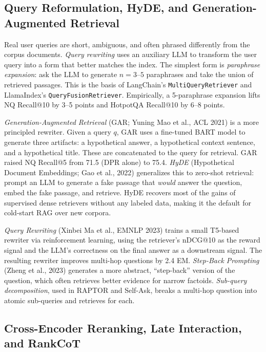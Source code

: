 \documentclass{article}
\begin{document}
\subsection{Query Reformulation, HyDE, and Generation-Augmented Retrieval}\label{query-reformulation-hyde-and-generation-augmented-retrieval}

Real user queries are short, ambiguous, and often phrased differently from the corpus documents. \emph{Query rewriting} uses an auxiliary LLM to transform the user query into a form that better matches the index. The simplest form is \emph{paraphrase expansion}: ask the LLM to generate \(n=3\)--\(5\) paraphrases and take the union of retrieved passages. This is the basis of LangChain's \texttt{MultiQueryRetriever} and LlamaIndex's \texttt{QueryFusionRetriever}. Empirically, a 5-paraphrase expansion lifts NQ Recall@10 by 3--5 points and HotpotQA Recall@10 by 6--8 points.

\emph{Generation-Augmented Retrieval} (GAR; Yuning Mao et al., ACL 2021) is a more principled rewriter. Given a query \(q\), GAR uses a fine-tuned BART model to generate three artifacts: a hypothetical answer, a hypothetical context sentence, and a hypothetical title. These are concatenated to the query for retrieval. GAR raised NQ Recall@5 from 71.5 (DPR alone) to 75.4. \emph{HyDE} (Hypothetical Document Embeddings; Gao et al., 2022) generalizes this to zero-shot retrieval: prompt an LLM to generate a fake passage that \emph{would} answer the question, embed the fake passage, and retrieve. HyDE recovers most of the gains of supervised dense retrievers without any labeled data, making it the default for cold-start RAG over new corpora.

\emph{Query Rewriting} (Xinbei Ma et al., EMNLP 2023) trains a small T5-based rewriter via reinforcement learning, using the retriever's nDCG@10 as the reward signal and the LLM's correctness on the final answer as a downstream signal. The resulting rewriter improves multi-hop questions by 2.4 EM. \emph{Step-Back Prompting} (Zheng et al., 2023) generates a more abstract, ``step-back'' version of the question, which often retrieves better evidence for narrow factoids. \emph{Sub-query decomposition}, used in RAPTOR and Self-Ask, breaks a multi-hop question into atomic sub-queries and retrieves for each.

\subsection{Cross-Encoder Reranking, Late Interaction, and RankCoT}\label{cross-encoder-reranking-late-interaction-and-rankcot}
\end{document}
